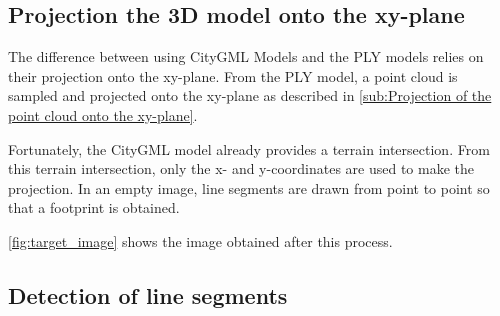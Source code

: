         \subsection{Projection the 3D model onto the xy-plane}
            The difference between using CityGML Models and the PLY models relies on their projection onto the xy-plane.
            From the PLY model, a point cloud is sampled and projected onto the xy-plane as described in \autoref{sub:Projection of the point cloud onto the xy-plane}.

            Fortunately, the CityGML model already provides a terrain intersection.
            From this terrain intersection, only the x- and y-coordinates are used to make the projection.
            In an empty image, line segments are drawn from point to point so that a footprint is obtained.

            \autoref{fig:target_image} shows the image obtained after this process.

            
        \subsection{Detection of line segments}

